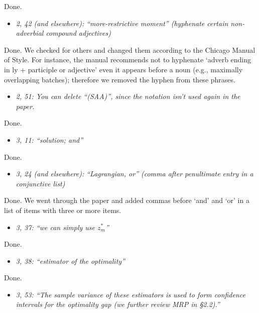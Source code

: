 \documentclass[11pt,notitlepage,onecolumn]{article}
\newcommand{\noi}{\noindent}
\begin{document}
\noi
Done.  
\medskip 


\begin{itemize}
\item[] \textit{2, 42 (and elsewhere): ``more-restrictive moment'' (hyphenate certain non-adverbial compound adjectives)}
\end{itemize}

\noi
Done.  
We checked for others and changed them according to the Chicago Manual of Style. 
For instance, the manual recommends not to hyphenate `adverb ending in ly + participle or adjective' even it appears before a noun (e.g., maximally overlapping batches); therefore we removed the hyphen from these phrases. 
\medskip 


\begin{itemize}
\item[] \textit{2, 51: You can delete ``(SAA)'', since the notation isn't used again in the paper.}
\end{itemize}

\noi
Done.  
\medskip 


\begin{itemize}
\item[] \textit{3, 11: ``solution; and''}
\end{itemize}

\noi
Done.
\medskip 


\begin{itemize}
\item[] \textit{3, 24 (and elsewhere): ``Lagrangian, or'' (comma after penultimate entry in a conjunctive list)}
\end{itemize}

\noi
Done.  
We went through the paper and added commas before `and' and `or' in a list of items with three or more items.
\medskip 


\begin{itemize}
\item[] \textit{3, 37: ``we can simply use $z_m^*$''}
\end{itemize}

\noi
Done. 
\medskip 


\begin{itemize}
\item[] \textit{3, 38: ``estimator of the optimality''}
\end{itemize}

\noi
Done.  
\medskip 


\begin{itemize}
\item[] \textit{3, 53: ``The sample variance of these estimators is used to form confidence intervals for the optimality gap (we further review MRP in \S 2.2).''}
\end{itemize}
\end{document}
